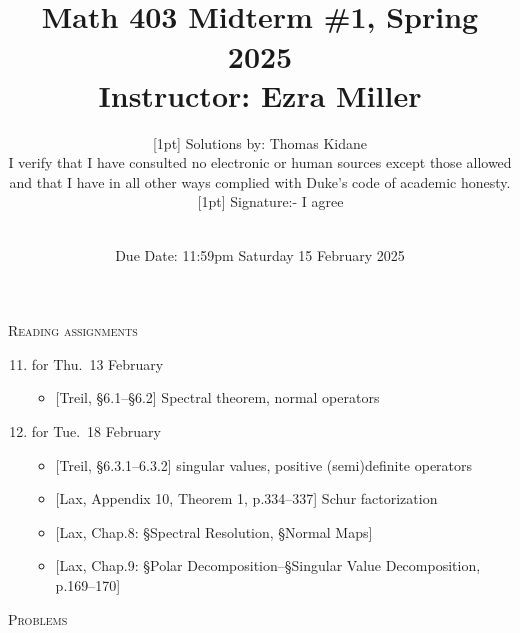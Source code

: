 \documentclass[11pt]{article}
\newcommand\total[2]{\marginpar{\colorbox{yellow}{\huge #1/#2}}}
\newcommand\0{\mathbf{0}}
\newcommand\<{\langle}
\renewcommand\>{\rangle}
\begin{document}


\title{\mbox{}\\[-11.4ex]Math 403 Midterm \#1, Spring 2025\\\normalsize
	Instructor: Ezra Miller\\[-2.5ex]}
\author{[1pt] Solutions by: Thomas Kidane\\[1ex]
I verify that I have consulted no electronic or human sources except
those allowed\\
and that I have in all other ways complied with Duke's code of
academic honesty.\hfill\mbox{}\\[.5ex]
\ \ \ [1pt] Signature:- I agree}
\date{\mbox{}\\[-2.6ex]Due Date: 11:59pm Saturday 15 February 2025}

\maketitle
\thispagestyle{empty}%

\vspace{-5ex}%
\noindent
\textsc{Reading assignments}\total{}{100}%
\begin{enumerate}[itemsep=-1ex]\setcounter{enumi}{10}
\item%
for Thu.~13 February
  \begin{itemize}
  \item{}%
  [Treil, \S 6.1--\S 6.2] Spectral theorem, normal operators
  \end{itemize}

\item%
for Tue.~18 February
  \begin{itemize}
  \item{}%
  [Treil, \S 6.3.1--6.3.2] singular values, positive (semi)definite operators
  \item{}%
  [Lax, Appendix 10, Theorem 1, p.334--337] Schur factorization
  \item{}%
  [Lax, Chap.8: \S Spectral Resolution, \S Normal Maps]
  \item{}%
  [Lax, Chap.9: \S Polar Decomposition--\S Singular Value
  Decomposition, p.169--170]
  \end{itemize}
\end{enumerate}

\noindent
\textsc{Problems}
\end{document}
